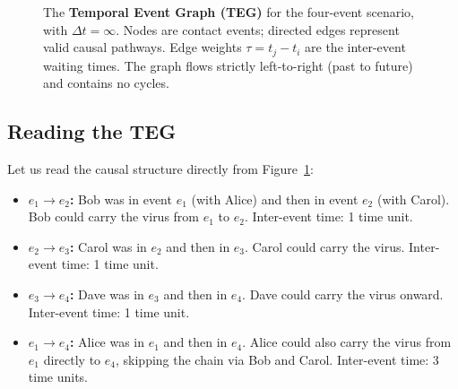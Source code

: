 \begin{figure}[H]
\centering
{}
\caption{The \textbf{Temporal Event Graph (TEG)} for the four-event scenario,
with $\Delta t = \infty$. Nodes are contact events; directed edges represent
valid causal pathways. Edge weights $\tau = t_j - t_i$ are the inter-event
waiting times. The graph flows strictly left-to-right (past to future) and
contains no cycles.}
\label{fig:teg_full}
\end{figure}

\subsection{Reading the TEG}

Let us read the causal structure directly from Figure~\ref{fig:teg_full}:

\begin{itemize}
    \item \textbf{$e_1 \to e_2$:} Bob was in event $e_1$ (with Alice) and then
          in event $e_2$ (with Carol). Bob could carry the virus from $e_1$ to
          $e_2$. Inter-event time: 1 time unit.
    \item \textbf{$e_2 \to e_3$:} Carol was in $e_2$ and then in $e_3$. Carol
          could carry the virus. Inter-event time: 1 time unit.
    \item \textbf{$e_3 \to e_4$:} Dave was in $e_3$ and then in $e_4$. Dave
          could carry the virus onward. Inter-event time: 1 time unit.
    \item \textbf{$e_1 \to e_4$:} Alice was in $e_1$ and then in $e_4$. Alice
          could also carry the virus from $e_1$ directly to $e_4$, skipping the
          chain via Bob and Carol. Inter-event time: 3 time units.
\end{itemize}

